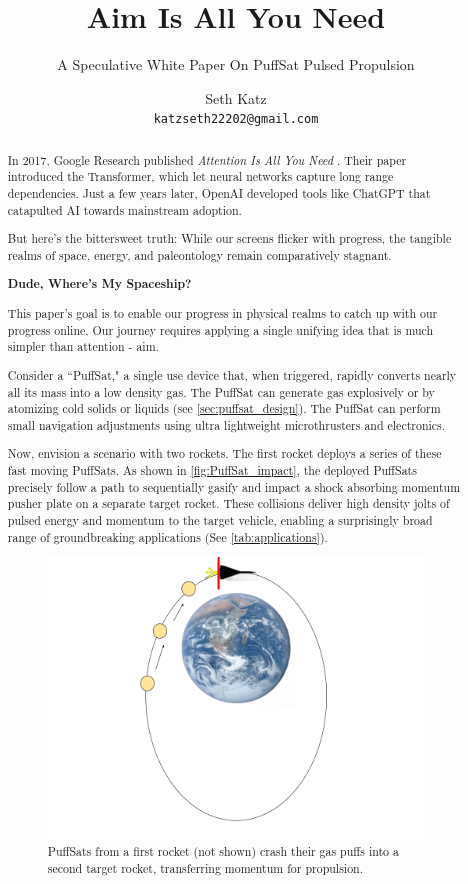 \documentclass{article}
\title{Aim Is All You Need}
\subtitle{A Speculative White Paper On PuffSat Pulsed Propulsion}
\author{
  Seth Katz \\
  \texttt{katzseth22202@gmail.com} \\
}
\begin{document}
\maketitle

\newpage
\tableofcontents
\newpage

\begin{abstract}\label{sec:abstract}
 
In 2017, Google Research published \textit{Attention Is All You Need} \cite{vaswani2023attentionneed}.  Their paper introduced the Transformer, which let neural networks capture long range dependencies.   Just a few years later, OpenAI developed tools like ChatGPT \cite{chatgpt} that catapulted AI towards mainstream adoption.

But here's the bittersweet truth:  While our screens flicker with progress, the tangible realms of space, energy, and paleontology remain comparatively stagnant.

\textbf{Dude, Where's My Spaceship?}

This paper's goal is to enable our progress in physical realms to catch up with our progress online.  Our journey requires applying a single unifying idea that is much simpler than attention - aim.   

Consider a “PuffSat," a single use device that, when triggered, rapidly converts nearly all its mass into a low density gas.  The PuffSat can generate gas explosively or by atomizing cold solids or liquids (see \autoref{sec:puffsat_design}).  The PuffSat can perform small navigation adjustments using ultra lightweight microthrusters and electronics.

Now, envision a scenario with two rockets. The first rocket deploys a series of these fast moving PuffSats. As shown in \autoref{fig:PuffSat_impact}, the deployed PuffSats precisely follow a path to sequentially gasify and impact a shock absorbing momentum pusher plate on a separate target rocket. These collisions deliver high density jolts of pulsed energy and momentum to the target vehicle, enabling a surprisingly broad range of groundbreaking applications (See \autoref{tab:applications}). 

\begin{figure}[htpb]
    \centering
    \includegraphics[width=0.5\linewidth]{images/Starship_Impact_ellipse.png}
    \caption{PuffSats from a first rocket (not shown) crash their gas puffs into a second target rocket, transferring momentum for propulsion. \cite{earth_image}}
    \label{fig:PuffSat_impact}
\end{figure}


\end{abstract}
\end{document}
